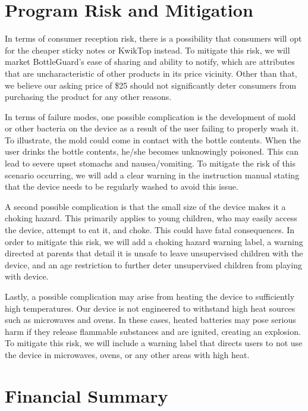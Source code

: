 \documentclass[12pt]{article}
\begin{document}
	\section*{Program Risk and Mitigation}
	In terms of consumer reception risk, there is a possibility that consumers will opt for the cheaper sticky notes or KwikTop instead. To mitigate this risk, we will market BottleGuard’s ease of sharing and ability to notify, which are attributes that are uncharacteristic of other products in its price vicinity. Other than that, we believe our asking price of \$25 should not significantly deter consumers from purchasing the product for any other reasons.
	
	In terms of failure modes, one possible complication is the development of mold or other bacteria on the device as a result of the user failing to properly wash it. To illustrate, the mold could come in contact with the bottle contents. When the user drinks the bottle contents, he/she becomes unknowingly poisoned. This can lead to severe upset stomachs and nausea/vomiting. To mitigate the risk of this scenario occurring, we will add a clear warning in the instruction manual stating that the device needs to be regularly washed to avoid this issue. 
	
	A second possible complication is that the small size of the device makes it a choking hazard. This primarily applies to young children, who may easily access the device, attempt to eat it, and choke. This could have fatal consequences. In order to mitigate this risk, we will add a choking hazard warning label, a warning directed at parents that detail it is unsafe to leave unsupervised children with the device, and an age restriction to further deter unsupervised children from playing with device.
	
	Lastly, a possible complication may arise from heating the device to sufficiently high temperatures. Our device is not engineered to withstand high heat sources such as microwaves and ovens. In these cases, heated batteries may pose serious harm if they release flammable substances and are ignited, creating an explosion. To mitigate this risk, we will include a warning label that directs users to not use the device in microwaves, ovens, or any other areas with high heat.
	
	
	
	
	\section*{Financial Summary}
\end{document}
